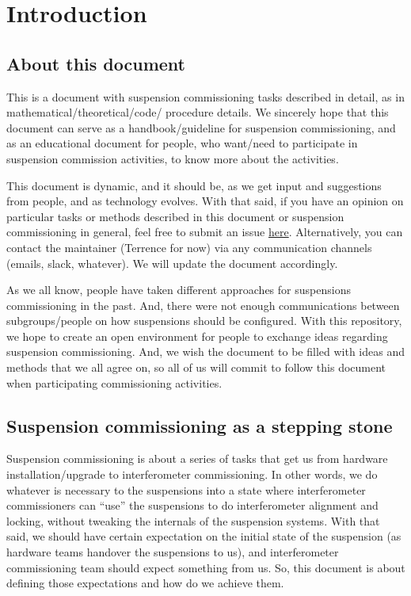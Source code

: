 \section{Introduction}

\subsection{About this document}
This is a document with suspension commissioning tasks described in detail, as in mathematical/theoretical/code/ procedure details.
We sincerely hope that this document can serve as a handbook/guideline for suspension commissioning, and as an educational document for people, who want/need to participate in suspension commission activities, to know more about the activities.

This document is dynamic, and it should be, as we get input and suggestions from people, and as technology evolves.
With that said, if you have an opinion on particular tasks or methods described in this document or suspension commissioning in general, feel free to submit an issue \href{https://github.com/gw-vis/vis-commissioning-tex/issues}{here}.
Alternatively, you can contact the maintainer (Terrence for now) via any communication channels (emails, slack, whatever).
We will update the document accordingly.

As we all know, people have taken different approaches for suspensions commissioning in the past.
And, there were not enough communications between subgroups/people on how suspensions should be configured.
With this repository, we hope to create an open environment for people to exchange ideas regarding suspension commissioning.
And, we wish the document to be filled with ideas and methods that we all agree on, so all of us will commit to follow this document when participating commissioning activities.


\subsection{Suspension commissioning as a stepping stone}
Suspension commissioning is about a series of tasks that get us from hardware installation/upgrade to interferometer commissioning.
In other words, we do whatever is necessary to the suspensions into a state where interferometer commissioners can ``use'' the suspensions to do interferometer alignment and locking, without tweaking the internals of the suspension systems.
With that said, we should have certain expectation on the initial state of the suspension (as hardware teams handover the suspensions to us), and interferometer commissioning team should expect something from us.
So, this document is about defining those expectations and how do we achieve them.

